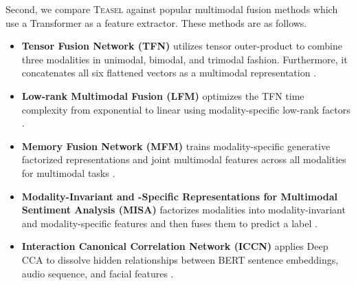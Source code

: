 \documentclass[letterpaper]{article} \usepackage{spconf,amsmath,graphicx}
\newcommand{\teasel}{\textsc{Teasel }}
\begin{document}
Second, we compare \teasel against popular multimodal fusion methods which use a Transformer as a feature extractor. These methods are as follows.
\begin{itemize}
    \item \textbf{Tensor Fusion Network (TFN)}
            utilizes tensor outer-product to combine three modalities in unimodal, bimodal, and trimodal fashion. Furthermore, it concatenates all six flattened vectors as a multimodal representation \cite{zadeh2017tensor} .
    \item \textbf{Low-rank Multimodal Fusion (LFM)} optimizes the TFN time complexity from exponential to linear using modality-specific low-rank factors \cite{liu2018efficient}.
    
    \item \textbf{Memory Fusion Network (MFM)} trains modality-specific generative factorized representations and joint multimodal features across all modalities for multimodal tasks \cite{tsai2018learning}.
    
    \item \textbf{Modality-Invariant and -Specific Representations for Multimodal Sentiment Analysis (MISA)} factorizes modalities into modality-invariant and modality-specific features and then fuses them to predict a label \cite{hazarika2020misa}.
    
    \item \textbf{Interaction Canonical Correlation Network (ICCN)} applies Deep CCA to dissolve hidden relationships between BERT sentence embeddings, audio sequence, and facial features \cite{sun2020learning}.
    

    
\end{itemize}
\end{document}
